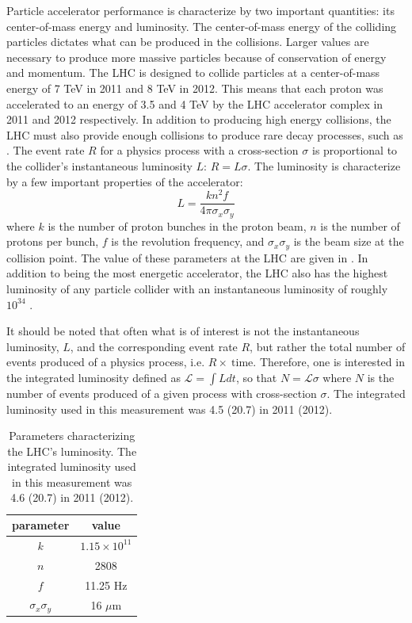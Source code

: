 Particle accelerator performance is characterize by two important quantities:
its center-of-mass energy and luminosity.
The center-of-mass energy of the colliding particles dictates what can
be produced in the collisions.
Larger values are necessary
to produce more massive particles because of conservation of energy and momentum. 
The LHC is designed to collide particles
at a center-of-mass energy of 7 TeV in 2011 and 8 TeV in 2012. This means
that each proton was accelerated to an energy of 3.5 and 4 TeV by the LHC
accelerator complex in 2011 and 2012 respectively. 
In addition to producing high energy collisions,
the LHC must also provide enough collisions to produce rare decay processes,
such as \HToZg.
The event rate $R$ for a physics process with a cross-section $\sigma$
is proportional to the collider's instantaneous luminosity $L$: $R = L\sigma$. 
The luminosity
is characterize by a few important properties of the accelerator:
\[
    L = \frac{k n^2 f}{4\pi \sigma_x \sigma_y}
\]
where $k$ is the number of proton bunches in the proton beam, 
$n$ is the number of protons per
bunch, $f$ is the revolution frequency, and $\sigma_x\sigma_y$ is the
beam size at the collision point. The value of these parameters at the
LHC are given in . In addition to being the most
energetic accelerator, the LHC also has the highest luminosity of any particle
collider with an instantaneous luminosity of roughly $10^{34}$  .

It should be noted that often what is of interest is not the instantaneous luminosity,
$L$, and the corresponding  event rate $R$, but rather the total number
of events produced of a physics process, i.e. $R \times ~\mathrm{time}$. Therefore,
one is interested in the integrated luminosity defined as 
$\mathcal{L} = \int L dt$, so that $N = \mathcal{L}\sigma$ where
$N$ is the number of events produced of a given process with cross-section $\sigma$.
The integrated luminosity used in this measurement was 4.5 (20.7) \fb in 2011 (2012).

\begin{table}[htbp]
  \begin{center}
    \begin{tabular}{cc}
    \hline\hline
    parameter & value  \\
    \hline
    $k$ &  $1.15 \times 10^{11}$ \\
    $n$ & 2808 \\
    $f$ & 11.25 Hz \\
    $\sigma_x\sigma_y$ &  16 $\mu$m\\
    \hline\hline
    \end{tabular}
    \caption{Parameters characterizing the LHC's luminosity. The integrated luminosity
    used in this measurement was 4.6 (20.7) \fb in 2011 (2012).}
    \label{tab:lhcparameters}
  \end{center}
\end{table}


